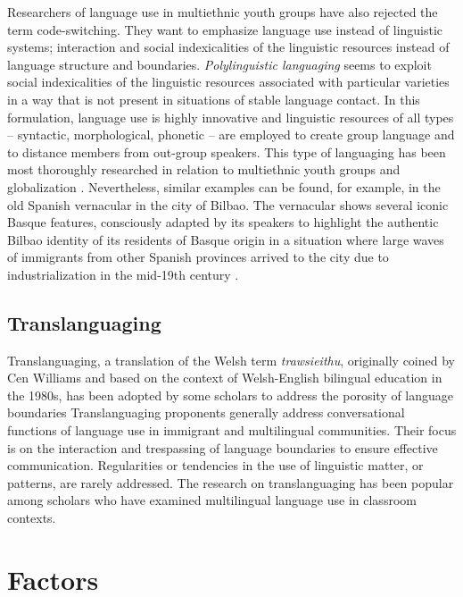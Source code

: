 \documentclass[output=paper]{langscibook}
\begin{document}
Researchers of language use in multiethnic youth groups have also rejected the term code-switching. They want to emphasize language use instead of linguistic systems; interaction and social indexicalities of the linguistic resources instead of language structure and boundaries. \textit{Polylinguistic languaging} \parencite{jorgensen2011polylanguaging} seems to exploit social indexicalities of the linguistic resources associated with particular varieties in a way that is not present in situations of stable language contact. In this formulation, language use is highly innovative and linguistic resources of all types – syntactic, morphological, phonetic – are employed to create group language and to distance members from out-group speakers. This type of languaging has been most thoroughly researched in relation to multiethnic youth groups and globalization \parencite{schoonen2005street,lehtonen2015tyylitellen}. Nevertheless, similar examples can be found, for example, in the old Spanish vernacular in the city of Bilbao. The vernacular shows several iconic Basque features, consciously adapted by its speakers to highlight the authentic Bilbao identity of its residents of Basque origin in a situation where large waves of immigrants from other Spanish provinces arrived to the city due to industrialization in the mid-19th century \parencite{lantto20165}.   

\subsection{Translanguaging} 
Translanguaging, a translation of the Welsh term \textit{trawsieithu}, originally coined by Cen Williams and based on the context of Welsh-English bilingual education in the 1980s, has been adopted by some scholars to address the porosity of language boundaries \parencite{garcia2009education,creese2010translanguaging,garcia2014translanguaging} 
Translanguaging proponents generally address conversational functions of language use in immigrant and multilingual communities. Their focus is on the interaction and  trespassing of language boundaries to ensure effective communication. Regularities or tendencies in the use of linguistic matter, or patterns, are rarely addressed. The research on translanguaging has been popular among scholars who have examined multilingual language use in classroom contexts.


\section{Factors}
\end{document}
